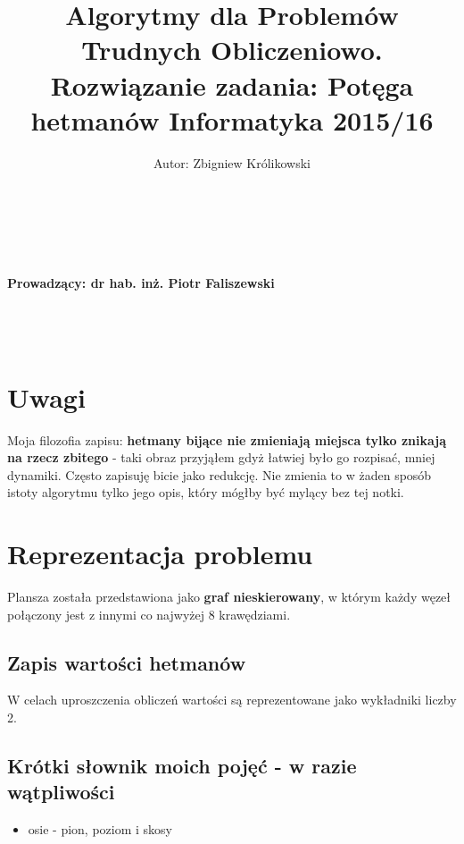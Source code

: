 \documentclass{article}
\author{Autor: Zbigniew Królikowski
\\\\\\\\}
\title{ Algorytmy dla Problemów Trudnych Obliczeniowo.\\
Rozwiązanie zadania: \textbf{Potęga hetmanów}
Informatyka 2015/16}
\begin{document}
\maketitle


\vfill

\paragraph{Prowadzący: dr hab. inż. Piotr Faliszewski
\\\\\\\\
}

\newpage

\tableofcontents

\newpage

\section{Uwagi}

Moja filozofia zapisu: \textbf{hetmany bijące nie zmieniają miejsca tylko znikają na rzecz zbitego} - taki obraz przyjąłem gdyż łatwiej było go rozpisać, mniej dynamiki. Często zapisuję bicie jako redukcję. Nie zmienia to w żaden sposób istoty algorytmu tylko jego opis, który mógłby być mylący bez tej notki.

\section{Reprezentacja problemu}

Plansza została przedstawiona jako \textbf{graf nieskierowany}, w którym każdy węzeł połączony jest z innymi co najwyżej 8 krawędziami.

\subsection{Zapis wartości hetmanów}

W celach uproszczenia obliczeń wartości są reprezentowane jako wykładniki liczby 2.

\subsection{Krótki słownik moich pojęć - w razie wątpliwości}

\begin{itemize}
\item osie - pion, poziom i skosy
\end{itemize}
\end{document}
